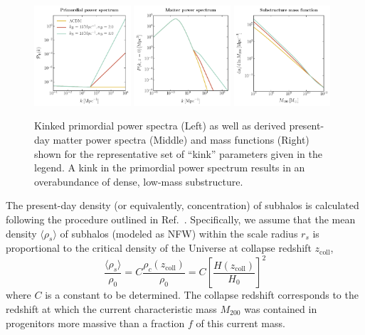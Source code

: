 \documentclass[prd,aps,10pt,nofootinbib,twocolumn,superscriptaddress,preprintnumbers,balancelastpage,longbibliography]{revtex4-1}
\begin{document}
\begin{figure}[]
  \centering
  \includegraphics[width=0.32\textwidth]{plots/primordial_kinked}
  \includegraphics[width=0.32\textwidth]{plots/matterpower_kinked}
  \includegraphics[width=0.32\textwidth]{plots/massfunction_kinked}
  \caption{Kinked primordial power spectra (Left) as well as derived present-day matter power spectra (Middle) and mass functions (Right) shown for the representative set of ``kink'' parameters given in the legend. A kink in the primordial power spectrum results in an overabundance of dense, low-mass substructure.}
  \label{fig:kinked_specs}
\end{figure}

The present-day density (or equivalently, concentration) of subhalos is calculated following the procedure outlined in Ref.~\cite{Ludlow:2016ifl}. Specifically, we assume that the mean density $\langle\rho_s\rangle$ of subhalos (modeled as NFW) within the scale radius $r_s$ is proportional to the critical density of the Universe at collapse redshift $z_\mathrm{coll}$,
\begin{equation}
\frac{\langle\rho_s\rangle}{\rho_0} = C\frac{\rho_c(z_\mathrm{coll})}{\rho_0} = C\left[\frac{H(z_\mathrm{coll})}{H_0}\right]^2
\label{eq:rho_s}
\end{equation}
where $C$ is a constant to be determined. The collapse redshift corresponds to the redshift at which the current characteristic mass $M_{200}$ was contained in progenitors more massive than a fraction $f$ of this current mass.
\end{document}

